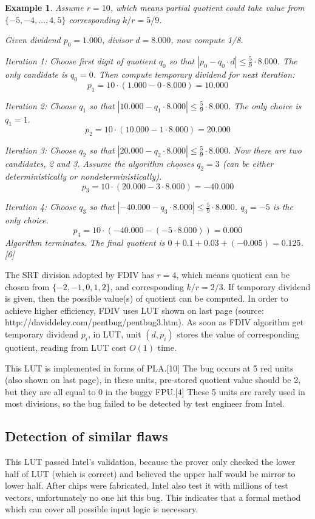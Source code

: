 \documentclass[11pt,twoside, onecolumn]{IEEEtran}
\newtheorem{Example}{Example}[section]
\begin{document}
\begin{Example}
Assume $r=10$, which means partial quotient could take value from $\{-5,-4,\dots,4,5\}$
corresponding $k/r = 5/9$.

Given dividend $p_0 = 1.000$, divisor $d = 8.000$, now compute 1/8.

Iteration 1: Choose first digit of quotient $q_0$ so that $|p_0-q_0\cdot d|\leq \frac{5}{9}\cdot 8.000$.
The only candidate is $q_0 = 0$. Then compute temporary dividend for next iteration:
\[
p_1 = 10\cdot(1.000 - 0\cdot 8.000) = 10.000
\]

Iteration 2: Choose $q_1$ so that $|10.000-q_1\cdot 8.000|\leq \frac{5}{9}\cdot 8.000$.
The only choice is $q_1 = 1$.
$$p_2 = 10\cdot(10.000 - 1\cdot 8.000) = 20.000$$

Iteration 3: Choose $q_2$ so that $|20.000-q_2\cdot 8.000|\leq \frac{5}{9}\cdot 8.000$.
Now there are two candidates, 2 and 3. Assume the algorithm chooses $q_2 = 3$ (can be either
deterministically or nondeterministically).
$$p_3 = 10\cdot(20.000 - 3\cdot 8.000) = -40.000$$

Iteration 4: Choose $q_3$ so that $|-40.000-q_3\cdot 8.000|\leq \frac{5}{9}\cdot 8.000$.
$q_3 = -5$ is the only choice.
$$p_4 = 10\cdot(-40.000 - (-5\cdot 8.000)) = 0.000$$
Algorithm terminates. The final quotient is $0+0.1+0.03+(-0.005) = 0.125$. [6]
\end{Example}

The SRT division adopted by FDIV has $r = 4$, which means quotient can be chosen
from $\{-2,-1,0,1,2\}$, and corresponding $k/r = 2/3$. If temporary dividend is given,
then the possible value(s) of quotient can be computed. In order to achieve higher efficiency,
FDIV uses LUT shown on last page (source: http://daviddeley.com/pentbug/pentbug3.htm).
As soon as FDIV algorithm get temporary dividend $p_i$, in LUT, unit $(d,p_i)$ stores
the value of corresponding quotient, reading from LUT cost $O(1)$ time.

This LUT is implemented in forms of PLA.[10] The bug occurs at 5 red units (also shown on last page),
in these units, pre-stored quotient value should be 2, but they are all equal to 0 in the buggy FPU.[4]
These 5 units are rarely used in most divisions, so the bug failed to be detected by test engineer
from Intel.

\subsection{Detection of similar flaws}
This LUT passed Intel's validation, because the prover only checked the lower half of
LUT (which is correct) and believed the upper half would be mirror to lower half.
After chips were fabricated, Intel also test it with millions of test vectors, unfortunately
no one hit this bug. This indicates that a formal method which can cover all possible
input logic is necessary.
\end{document}
